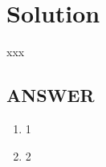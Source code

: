 
\section*{Solution}

xxx

\vfill
\subsection*{ANSWER}
\begin{enumerate}
    \item 1
    \item 2
\end{enumerate}